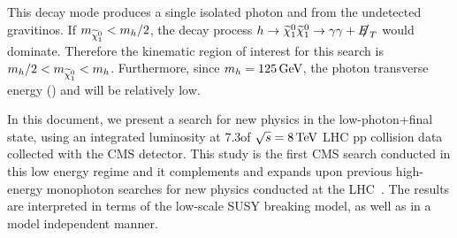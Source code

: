 
This decay mode produces a single isolated photon and \met from the undetected gravitinos. If $m_{\widetilde{\chi}^{0}_{1}} < m_{h}/2$, the decay process $h \to \PSGczDo \PSGczDo \to \gamma \gamma + \met$ would dominate. Therefore the kinematic region of interest for this search is $m_{h}/2 < m_{\widetilde{\chi}^{0}_{1}} < m_{h}$. Furthermore, since $m_{h} = 125 \,\text{Ge\hspace{-.08em}V}$, the photon transverse energy (\etg) and \met will be relatively low. 

In this document, we present a search for new physics in the low-\et photon+\met final state, using an integrated luminosity at 7.3\fbinv of $\sqrt{s}=8\,\text{Te\hspace{-.08em}V}$ LHC pp collision data collected with the CMS detector. This study is the first CMS search conducted in this low energy regime and it complements and expands upon previous high-energy monophoton searches for new physics conducted at the LHC~\cite{Chatrchyan:2012tea,Aad:2012fw}. The results are interpreted in terms of the low-scale SUSY breaking model, as well as in a model independent manner.


